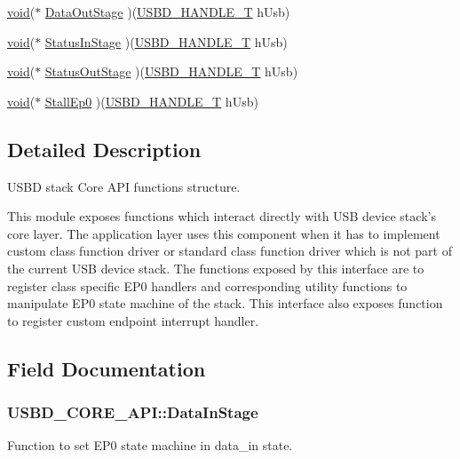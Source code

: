 \begin{DoxyCompactItemize}
\item 
\hyperlink{Paradigm_2Tern__EE_2small_2portmacro_8h_a14d32f8130d3c0b212cfc751730b5b49}{void}($\ast$ \hyperlink{structUSBD__CORE__API_ac4232f616e5ec409d0ca853bf704175f}{Data\-Out\-Stage} )(\hyperlink{group__USBD__Core_gafdbb2204d929cb9d75736bd2b42342ac}{U\-S\-B\-D\-\_\-\-H\-A\-N\-D\-L\-E\-\_\-\-T} h\-Usb)
\item 
\hyperlink{Paradigm_2Tern__EE_2small_2portmacro_8h_a14d32f8130d3c0b212cfc751730b5b49}{void}($\ast$ \hyperlink{structUSBD__CORE__API_a9b57a8360ef4b3acd63ede5773813b36}{Status\-In\-Stage} )(\hyperlink{group__USBD__Core_gafdbb2204d929cb9d75736bd2b42342ac}{U\-S\-B\-D\-\_\-\-H\-A\-N\-D\-L\-E\-\_\-\-T} h\-Usb)
\item 
\hyperlink{Paradigm_2Tern__EE_2small_2portmacro_8h_a14d32f8130d3c0b212cfc751730b5b49}{void}($\ast$ \hyperlink{structUSBD__CORE__API_aefbfebfc97c53ff2d5030fdd44dbec7e}{Status\-Out\-Stage} )(\hyperlink{group__USBD__Core_gafdbb2204d929cb9d75736bd2b42342ac}{U\-S\-B\-D\-\_\-\-H\-A\-N\-D\-L\-E\-\_\-\-T} h\-Usb)
\item 
\hyperlink{Paradigm_2Tern__EE_2small_2portmacro_8h_a14d32f8130d3c0b212cfc751730b5b49}{void}($\ast$ \hyperlink{structUSBD__CORE__API_a8ee40b044bb1327607dbb4185b2b7c93}{Stall\-Ep0} )(\hyperlink{group__USBD__Core_gafdbb2204d929cb9d75736bd2b42342ac}{U\-S\-B\-D\-\_\-\-H\-A\-N\-D\-L\-E\-\_\-\-T} h\-Usb)
\end{DoxyCompactItemize}


\subsection{Detailed Description}
U\-S\-B\-D stack Core A\-P\-I functions structure. 

This module exposes functions which interact directly with U\-S\-B device stack's core layer. The application layer uses this component when it has to implement custom class function driver or standard class function driver which is not part of the current U\-S\-B device stack. The functions exposed by this interface are to register class specific E\-P0 handlers and corresponding utility functions to manipulate E\-P0 state machine of the stack. This interface also exposes function to register custom endpoint interrupt handler. 

\subsection{Field Documentation}
\hypertarget{structUSBD__CORE__API_abe1068288a0eb073f7c9eee1466d4fae}{
\subsubsection[{Data\-In\-Stage}]{ U\-S\-B\-D\-\_\-\-C\-O\-R\-E\-\_\-\-A\-P\-I\-::\-Data\-In\-Stage}}\label{structUSBD__CORE__API_abe1068288a0eb073f7c9eee1466d4fae}
Function to set E\-P0 state machine in data\-\_\-in state.

